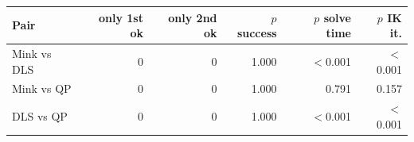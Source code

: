 \begin{tabular}{lrrrrr}
\toprule
Pair & only 1st ok & only 2nd ok & $p$ success & $p$ solve time & $p$ IK it.\\
\midrule
Mink vs DLS & 0 & 0 & 1.000 & $<$0.001 & $<$0.001\\
Mink vs QP & 0 & 0 & 1.000 & 0.791 & 0.157\\
DLS vs QP & 0 & 0 & 1.000 & $<$0.001 & $<$0.001\\
\bottomrule
\end{tabular}
